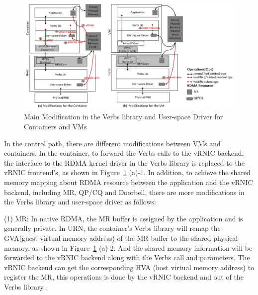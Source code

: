 \begin{figure}[!ht]
	\centering
	\includegraphics[width=1.0\linewidth]{images/verbs-driver}
	\caption{Main Modification in the Verbs library and User-space Driver for Containers and VMs}
	\label{fig:verbs-driver}
\end{figure}

In the control path, there are different modifications between VMs and containers. In the container, to forward the Verbs calls to the vRNIC backend, the interface to the RDMA kernel driver in the Verbs library is replaced to the vRNIC frontend's, as shown in Figure~\ref{fig:verbs-driver} (a)-1. In addition, to achieve the shared memory mapping about RDMA resource  between the application and the vRNIC backend, including MR, QP/CQ and Doorbell, there are more modifications in the Verbs library and user-space driver as follows:

(1) MR: In native RDMA, the MR buffer is assigned by the application and is generally private. In URN, the container's Verbs library will remap the GVA(guest virtual memory address) of the MR buffer to the shared physical memory, as shown in Figure~\ref{fig:verbs-driver} (a)-2. And the shared memory information will be forwarded to the vRNIC backend along with the Verbs call and parameters. The vRNIC backend can get the corresponding HVA (host virtual memory address) to register the MR, this operations is done by the vRNIC backend and out of the Verbs library .

